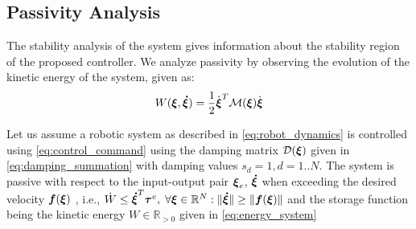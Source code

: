 \subsection{Passivity Analysis}
The stability analysis of the system gives information about the stability region of the proposed controller. We analyze passivity by observing the evolution of the kinetic energy of the system, given as:
\begin{equation}
	W(\vecs \xi, \vecs{\dot \xi}) = \frac{1}{2}  \dot{\vecs{\xi}}^T \matd{M}(\vecs \xi) \dot{\vecs{\xi}} \label{eq:energy_system}
\end{equation}

\begin{lemma} \label{lemma:passivity}
   Let us assume a robotic system as described in \eqref{eq:robot_dynamics} is controlled using \eqref{eq:control_command} using the damping matrix $\mathcal{D}(\boldsymbol{\xi})$ given in \eqref{eq:damping_summation} with damping values $s_d = 1, d = 1 .. N$.
   The system is passive with respect to the input-output pair $\boldsymbol{\xi}_e$, $\boldsymbol{\dot \xi}$ when exceeding the desired velocity $\boldsymbol{f}(\boldsymbol{\xi})$ , i.e., $\dot{W} \leq \boldsymbol{\dot \xi}^T \boldsymbol{\tau}^e, \; \forall \boldsymbol{\xi} \in \mathbb{R}^N: \| \boldsymbol{\dot \xi} \| \geq \| \boldsymbol{f}(\boldsymbol{\xi}) \|$ and the storage function being the kinetic energy $W \in \mathbb{R}_{>0}$ given in \eqref{eq:energy_system}
\end{lemma}

